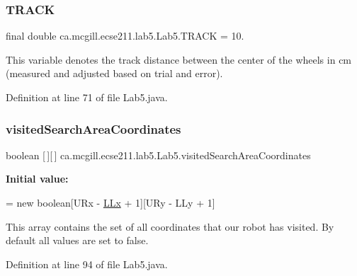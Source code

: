 \subsubsection{\texorpdfstring{T\+R\+A\+CK}{TRACK}}
{\footnotesize\ttfamily final double ca.\+mcgill.\+ecse211.\+lab5.\+Lab5.\+T\+R\+A\+CK = 10.\hspace{0.3cm}{\ttfamily [static]}}

This variable denotes the track distance between the center of the wheels in cm (measured and adjusted based on trial and error). 

Definition at line 71 of file Lab5.\+java.

\mbox{\label{classca_1_1mcgill_1_1ecse211_1_1lab5_1_1_lab5_a27ae00bb6fbeed54573af9cc5c3dc32e}} 
\subsubsection{\texorpdfstring{visited\+Search\+Area\+Coordinates}{visitedSearchAreaCoordinates}}
{\footnotesize\ttfamily boolean \mbox{[}$\,$\mbox{]}\mbox{[}$\,$\mbox{]} ca.\+mcgill.\+ecse211.\+lab5.\+Lab5.\+visited\+Search\+Area\+Coordinates\hspace{0.3cm}{\ttfamily [static]}}

{\bfseries Initial value\+:}
\begin{DoxyCode}
=
      \textcolor{keyword}{new} \textcolor{keywordtype}{boolean}[URx - \hyperlink{classca_1_1mcgill_1_1ecse211_1_1lab5_1_1_lab5_a957a526ed669e9d8b7fc485e21385ee9}{LLx} + 1][URy - LLy + 1]
\end{DoxyCode}
This array contains the set of all coordinates that our robot has visited. By default all values are set to false. 

Definition at line 94 of file Lab5.\+java.

\mbox{\label{classca_1_1mcgill_1_1ecse211_1_1lab5_1_1_lab5_ab9b6fc96d3fb1ac6c7d69d1727b3bbdd}} 
